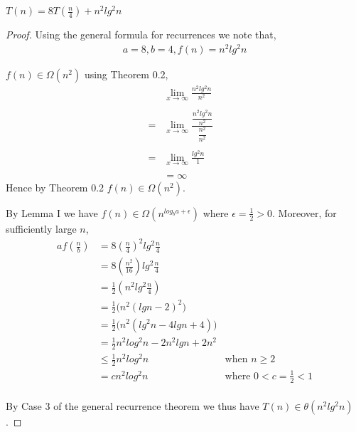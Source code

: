 \documentclass[12pt]{article}
\newenvironment{lemma}[2][Lemma]{\begin{trivlist}
\item[\hskip \labelsep {\bfseries #1}\hskip \labelsep {\bfseries #2.}]}{\end{trivlist}}
\newenvironment{question}[2][Question]{\begin{trivlist}
\item[\hskip \labelsep {\bfseries #1}\hskip \labelsep {\bfseries #2.}]}{\end{trivlist}}
\begin{document}
\begin{question}{5 (c)} $T(n) = 8T(\frac{n}{4}) + n^{2}lg^{2}n$
  \begin{proof}
    Using the general formula for recurrences we note that,
    \begin{align*}
      a = 8, b = 4, f(n) = n^{2}lg^{2}n
    \end{align*}

    \begin{lemma}{I} $f(n) \in \Omega(n^{2})$ using Theorem 0.2,
      \begin{align*}
        & \lim_{x\to\infty} \frac{
            n^{2}lg^{2}n
          }{
            n^{2}
          } &\\ \\
        = & \lim_{x\to\infty} \frac{
          \dfrac{n^{2}lg^{2}n}{n^{2}}
        }{
          \dfrac{n^{2}}{n^{2}}
        } &\\ \\
        = & \lim_{x\to\infty} \frac{
          lg^{2}n
        }{
          1
        }&\\ \\
        & = \infty &
      \end{align*}
      Hence by Theorem 0.2 $f(n) \in \Omega(n^{2})$.
    \end{lemma}

    By Lemma I we have $f(n) \in \Omega(n^{log_{b}a + \epsilon})$ where
    $\epsilon = \frac{1}{2} > 0$.
    Moreover, for sufficiently large $n$,
    \begin{align*}
      af(\frac{n}{b}) & = 8(\frac{n}{4})^{2}lg^{2}\frac{n}{4}&\\
                      & = 8(\frac{n^{2}}{16})lg^{2}\frac{n}{4}&\\
                      & = \frac{1}{2}(n^{2}lg^{2}\frac{n}{4})&\\
                      & = \frac{1}{2} \bigl(n^{2}(lgn - 2)^{2}\bigr) &\\
                      & = \frac{1}{2} \bigl(n^{2}(lg^{2}n - 4lgn + 4)\bigr) &\\
                      & = \frac{1}{2}n^{2}log^{2}n - 2n^{2}lgn + 2n^{2}&\\
                      & \leq \frac{1}{2}n^{2}log^{2}n & \text{when $n \geq 2$}\\
                      & = cn^{2}log^{2}n & \text{where $0 < c = \frac{1}{2} < 1$}\\
    \end{align*}

    By Case 3 of the general recurrence theorem we thus have $T(n) \in \theta(n^{2}lg^{2}n)$.
  \end{proof}
\end{question}
\end{document}
